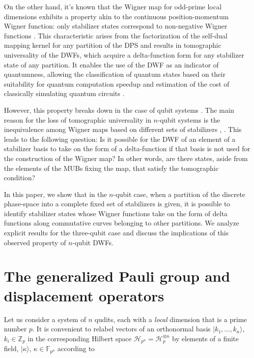 \documentclass[quantumrep,article,submit,pdftex,moreauthors]{Definitions/mdpi}
\begin{document}
On the other hand, it's known that the Wigner map for odd-prime local
dimensions exhibits a property akin to the continuous position-momentum
Wigner function: only stabilizer states correspond to non-negative Wigner
functions \cite{gross}. This characteristic arises from the factorization of
the self-dual mapping kernel for any partition of the DPS and results in
tomographic universality of the DWFs, which acquire a delta-function form
for any stabilizer state of any partition. It enables the use of the DWF as
an indicator of quantumness, allowing the classification of quantum states
based on their suitability for quantum computation speedup and estimation of
the cost of classically simulating quantum circuits \cite{Raus17,UniqueWF,
cohomo, contextMagic, WignerContext}.

However, this property breaks down in the case of qubit systems \cite{UniqueWF,
cohomo,contextMagic}. The main reason for the loss of tomographic universality
in $n$-qubit systems is the inequivalence among Wigner maps based on different
sets of stabilizers \cite{Bjork2007}, \cite{qip17}. This leads to the following
question: Is it possible for the DWF of an element of a stabilizer basis to take
on the form of a delta-function if that basis is not used for the construction
of the Wigner map? In other words, are there states, aside from the elements of
the MUBs fixing the map, that satisfy the tomographic condition?

In this paper, we show that in the $n$-qubit case, when a partition of the
discrete phase-space into a complete fixed set of stabilizers is given, it
is possible to identify stabilizer states whose Wigner functions take on the
form of delta functions along commutative curves belonging to other
partitions. We analyze explicit results for the three-qubit case and discuss
the implications of this observed property of $n$-qubit DWFs.

\section{The generalized Pauli group and displacement operators}

Let us consider a system of $n$ qudits, each with a \textit{local} dimension
that is a prime number $p$. It is convenient to relabel vectors of an
orthonormal basis $|k_{1},\ldots,k_{n}\rangle$, $k_{i} \in \mathbb{Z}_{p}$ in
the corresponding Hilbert space $\mathcal{H}_{p^{n}}=\mathcal{H}_{p}^{\otimes
n}$ by elements of a finite field, $|\kappa \rangle$, $\kappa \in
\mathbb{F}_{p^{n}}$ according to 
\end{document}
